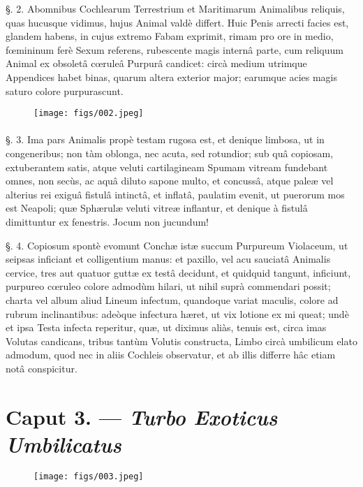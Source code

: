 \documentclass[a4paper, 11pt, oneside, polutonikogreek, german]{article}
\begin{document}
§. 2. Abomnibus Cochlearum Terrestrium et Maritimarum Animalibus reliquis, quas hucusque vidimus, hujus Animal valdè differt. Huic Penis arrecti facies est, glandem habens, in cujus extremo Fabam exprimit, rimam pro ore in medio, fœmininum ferè Sexum referens, rubescente magis internâ parte, cum reliquum Animal ex obsoletâ cœruleâ Purpurâ candicet: circà medium utrimque Appendices habet binas, quarum altera exterior major; earumque acies magis saturo colore purpurascunt.

\begin{figure}[H]
\centering
\texttt{[image: figs/002.jpeg]}

\end{figure}
\paragraph{}
§. 3. Ima pars Animalis propè testam rugosa est, et denique limbosa, ut in congeneribus; non tàm oblonga, nec acuta, sed rotundior; sub quâ copiosam, extuberantem satis, atque veluti cartilagineam Spumam vitream fundebant omnes, non secùs, ac aquâ diluto sapone multo, et concussâ, atque paleæ vel alterius rei exiguâ fistulâ intinctâ, et inflatâ, paulatim evenit, ut puerorum mos est Neapoli; quæ Sphærulæ veluti vitreæ inflantur, et denique à fistulâ dimittuntur ex fenestris. Jocum non jucundum!

§. 4. Copiosum spontè evomunt Conchæ istæ succum Purpureum Violaceum, ut seipsas inficiant et colligentium manus: et paxillo, vel acu sauciatâ Animalis cervice, tres aut quatuor guttæ ex testâ decidunt, et quidquid tangunt, inficiunt, purpureo cœruleo colore admodùm hilari, ut nihil suprà commendari possit; charta vel album aliud Lineum infectum, quandoque variat maculis, colore ad rubrum inclinantibus: adeòque infectura hæret, ut vix lotione ex mi queat; undè et ipsa Testa infecta reperitur, quæ, ut diximus aliàs, tenuis est, circa imas Volutas candicans, tribus tantùm Volutis constructa, Limbo circà umbilicum elato admodum, quod nec in aliis Cochleis observatur, et ab illis differre hâc etiam notâ conspicitur.

\section{Caput 3. --- \emph{Turbo Exoticus Umbilicatus}}
\begin{figure}[H]
\centering
\texttt{[image: figs/003.jpeg]}

\end{figure}
\end{document}
